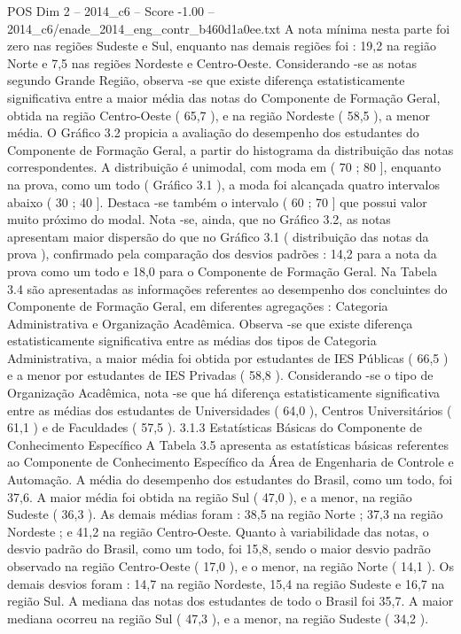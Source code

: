 \begin{textsample}{POS Dim 2 – 2014\_c6 – Score -1.00 – 2014\_c6/enade\_2014\_eng\_contr\_b460d1a0ee.txt}
A nota mínima nesta parte foi zero nas regiões Sudeste e Sul, enquanto nas demais regiões foi : 19,2 na região Norte e 7,5 nas regiões Nordeste e Centro-Oeste.
Considerando -se as notas segundo Grande Região, observa -se que existe diferença estatisticamente significativa entre a maior média das notas do Componente de Formação Geral, obtida na região Centro-Oeste ( 65,7 ), e na região Nordeste ( 58,5 ), a menor média.
O Gráfico 3.2 propicia a avaliação do desempenho dos estudantes do Componente de Formação Geral, a partir do histograma da distribuição das notas correspondentes.
A distribuição é unimodal, com moda em ( 70 ; 80 ], enquanto na prova, como um todo ( Gráfico 3.1 ), a moda foi alcançada quatro intervalos abaixo ( 30 ; 40 ].
Destaca -se também o intervalo ( 60 ; 70 ] que possui valor muito próximo do modal.
Nota -se, ainda, que no Gráfico 3.2, as notas apresentam maior dispersão do que no Gráfico 3.1 ( distribuição das notas da prova ), confirmado pela comparação dos desvios padrões : 14,2 para a nota da prova como um todo e 18,0 para o Componente de Formação Geral.
Na Tabela 3.4 são apresentadas as informações referentes ao desempenho dos concluintes do Componente de Formação Geral, em diferentes agregações : Categoria Administrativa e Organização Acadêmica.
Observa -se que existe diferença estatisticamente significativa entre as médias dos tipos de Categoria Administrativa, a maior média foi obtida por estudantes de IES Públicas ( 66,5 ) e a menor por estudantes de IES Privadas ( 58,8 ).
Considerando -se o tipo de Organização Acadêmica, nota -se que há diferença estatisticamente significativa entre as médias dos estudantes de Universidades ( 64,0 ), Centros Universitários ( 61,1 ) e de Faculdades ( 57,5 ). 3.1.3 Estatísticas Básicas do Componente de Conhecimento Específico A Tabela 3.5 apresenta as estatísticas básicas referentes ao Componente de Conhecimento Específico da Área de Engenharia de Controle e Automação.
A média do desempenho dos estudantes do Brasil, como um todo, foi 37,6.
A maior média foi obtida na região Sul ( 47,0 ), e a menor, na região Sudeste ( 36,3 ).
As demais médias foram : 38,5 na região Norte ; 37,3 na região Nordeste ; e 41,2 na região Centro-Oeste.
Quanto à variabilidade das notas, o desvio padrão do Brasil, como um todo, foi 15,8, sendo o maior desvio padrão observado na região Centro-Oeste ( 17,0 ), e o menor, na região Norte ( 14,1 ).
Os demais desvios foram : 14,7 na região Nordeste, 15,4 na região Sudeste e 16,7 na região Sul.
A mediana das notas dos estudantes de todo o Brasil foi 35,7.
A maior mediana ocorreu na região Sul ( 47,3 ), e a menor, na região Sudeste ( 34,2 ).

\end{textsample}
